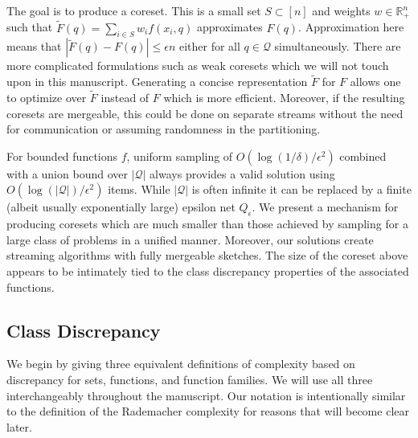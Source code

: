 \documentclass[anon,12pt]{colt2019} %
\newcommand{\R}{\mathbb{R}}
\newcommand{\eps}{\epsilon}
\begin{document}
The goal is to produce a coreset. This is a small set $S\subset [n]$ and weights $w \in\R_+^{n}$ such that $\tilde F(q) = \sum_{i \in S} w_i f(x_i,q)$ approximates $F(q)$.
Approximation here means that $|\tilde F(q)  - F(q)| \le \eps n$ either for all $q \in \mathcal Q$ simultaneously. %
There are more complicated formulations such as weak coresets which we will not touch upon in this manuscript. 
Generating a concise representation $\tilde F$ for $F$ allows one to optimize over $\tilde F$ instead of $F$ which is more efficient. 
Moreover, if the resulting coresets are mergeable, this could be done on separate streams without the need for communication or assuming randomness in the partitioning.

For bounded functions $f$, uniform sampling of $O(\log(1/\delta)/\eps^2)$ combined with a union bound over $|\mathcal Q|$ always provides a valid solution using $O(\log(|\mathcal Q|)/\eps^2)$ items. 
While $|\mathcal Q|$ is often infinite it can be replaced by a finite (albeit usually exponentially large) epsilon net $Q_\eps$. 
%
We present a mechanism for producing coresets which are much smaller than those achieved by sampling for a large class of problems in a unified manner.  
Moreover, our solutions create streaming algorithms with fully mergeable sketches. 
The size of the coreset above appears to be intimately tied to the class discrepancy properties of the associated functions.


\subsection{Class Discrepancy}
We begin by giving three equivalent definitions of complexity based on discrepancy for sets, functions, and function families. We will use all three interchangeably throughout the manuscript. 
Our notation is intentionally similar to the definition of the Rademacher complexity for reasons that will become clear later.
\end{document}

